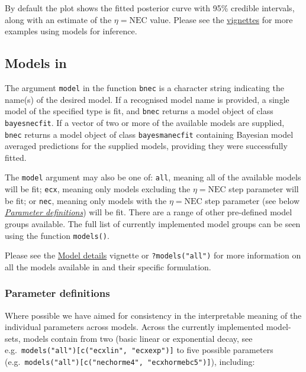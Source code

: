 \documentclass[
]{jss}
\begin{document}
By default the plot shows the fitted posterior curve with 95\% credible
intervals, along with an estimate of the \(\eta = \text{NEC}\) value.
Please see the
\href{https://open-aims.github.io/bayesnec/articles/}{vignettes} for
more examples using  models for inference.

\subsection[Models in bayesnec]{Models in
}\label{models-in}

The argument \texttt{model} in the function \texttt{bnec} is a character
string indicating the name(s) of the desired model. If a recognised
model name is provided, a single model of the specified type is fit, and
\texttt{bnec} returns a model object of class \texttt{bayesnecfit}. If a
vector of two or more of the available models are supplied,
\texttt{bnec} returns a model object of class \texttt{bayesmanecfit}
containing Bayesian model averaged predictions for the supplied models,
providing they were successfully fitted.

The \texttt{model} argument may also be one of: \texttt{all}, meaning
all of the available models will be fit; \texttt{ecx}, meaning only
models excluding the \(\eta = \text{NEC}\) step parameter will be fit;
or \texttt{nec}, meaning only models with the \(\eta = \text{NEC}\) step
parameter (see below
\protect\hyperlink{parameter-definitions}{\textit{Parameter definitions}})
will be fit. There are a range of other pre-defined model groups
available. The full list of currently implemented model groups can be
seen using the function \texttt{models()}.

Please see the
\href{https://open-aims.github.io/bayesnec/articles/example2b.html}{Model
details} vignette or \texttt{?models("all")} for more information on all
the models available in  and their specific formulation.

\hypertarget{parameter-definitions}{%
\subsubsection{Parameter definitions}\label{parameter-definitions}}

Where possible we have aimed for consistency in the interpretable
meaning of the individual parameters across models. Across the currently
implemented model-sets, models contain from two (basic linear or
exponential decay, see
e.g.~\texttt{models("all"){[}c("ecxlin",\ "ecxexp"){]}} to five possible
parameters
(e.g.~\texttt{models("all"){[}c("nechorme4",\ "ecxhormebc5"){]}}),
including:
\end{document}
